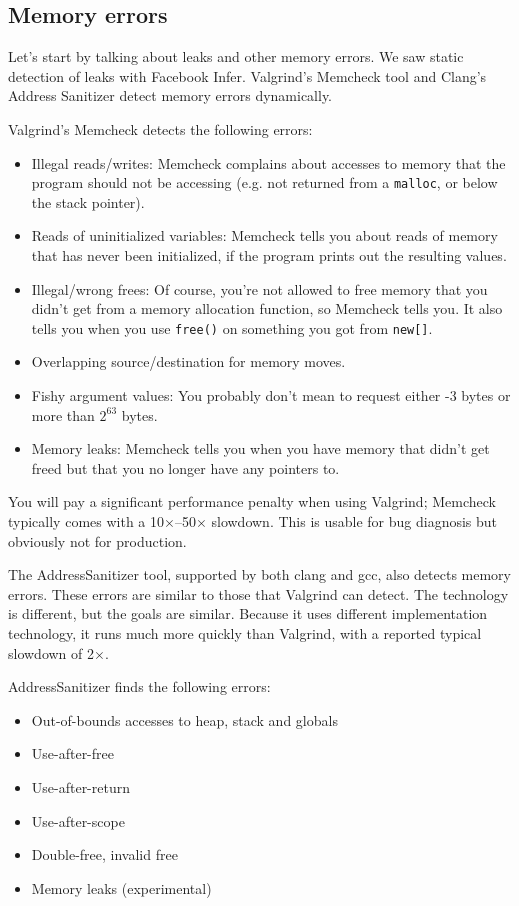 \documentclass[11pt]{article}
\begin{document}
{\subsection*{Memory errors}
Let's start by talking about leaks and other memory errors.
We saw static detection of leaks with Facebook Infer.
Valgrind's Memcheck tool and Clang's Address Sanitizer detect memory errors
dynamically.


Valgrind's Memcheck detects the following errors:
\begin{itemize}[noitemsep]
\item Illegal reads/writes: Memcheck complains about accesses to memory that
the program should not be accessing (e.g. not returned from a {\tt malloc}, or
below the stack pointer).
\item Reads of uninitialized variables: Memcheck tells you about reads of
memory that has never been initialized, if the program prints out the resulting values.
\item Illegal/wrong frees: Of course, you're not allowed to free memory that
you didn't get from a memory allocation function, so Memcheck tells you.
It also tells you when you use {\tt free()} on something you got from {\tt new[]}.
\item Overlapping source/destination for memory moves.
\item Fishy argument values: You probably don't mean to request either -3
bytes or more than $2^{63}$ bytes.
\item Memory leaks: Memcheck tells you when you have memory that didn't get freed
but that you no longer have any pointers to.
\end{itemize}
You will pay a significant performance penalty when using Valgrind; Memcheck typically
comes with a 10$\times$--50$\times$ slowdown. This is usable for bug diagnosis but
obviously not for production.

The AddressSanitizer tool, supported by both clang and gcc,
also detects memory errors. These errors are similar to those that
Valgrind can detect. The technology is different, but the goals are
similar. Because it uses different implementation technology, it runs
much more quickly than Valgrind, with a reported typical slowdown of
2$\times$.

AddressSanitizer finds the following errors:
\vspace*{-1em}
\begin{itemize}[noitemsep]
\item    Out-of-bounds accesses to heap, stack and globals
\item    Use-after-free
\item    Use-after-return
\item    Use-after-scope
\item    Double-free, invalid free
\item    Memory leaks (experimental)
\end{itemize}
\vspace*{-1em}

}
\end{document}
